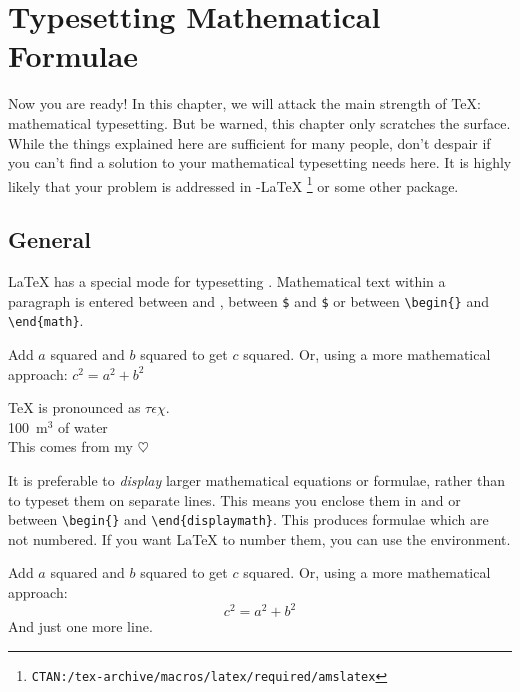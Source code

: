  
\chapter{Typesetting Mathematical Formulae}

\begin{intro}
  Now you are ready! In this chapter, we will attack the main strength
  of \TeX{}: mathematical typesetting. But be warned, this chapter
  only scratches the surface. While the things explained here are
  sufficient for many people, don't despair if you can't find a
  solution to your mathematical typesetting needs here. It is highly likely
  that your problem is addressed in \AmS-\LaTeX{}%
  \footnote{\texttt{CTAN:/tex-archive/macros/latex/required/amslatex}}
  or some other package.
\end{intro}
  
\section{General}

\LaTeX{} has a special mode for typesetting .
Mathematical text within a paragraph is entered between \ci{(}
and \ci{)},  %
between \texttt{\$} and \texttt{\$} or between %
\verb|\begin{|\verb|}| and \verb|\end{math}|.
\begin{example}
Add $a$ squared and $b$ squared 
to get $c$ squared. Or, using 
a more mathematical approach:
$c^{2}=a^{2}+b^{2}$
\end{example}
\begin{example}
\TeX{} is pronounced as 
$\tau\epsilon\chi$.\\[6pt]
100~m$^{3}$ of water\\[6pt]
This comes from my $\heartsuit$
\end{example}

It is preferable to \emph{display} larger mathematical equations or formulae,
rather than to typeset them on separate lines. This means you enclose them
in \ci{[} and \ci{]} or between
\verb|\begin{|\verb|}| and
  \verb|\end{displaymath}|.  This produces formulae which are not
numbered. If you want \LaTeX{} to number them, you can use the
 environment.
\begin{example}
Add $a$ squared and $b$ squared 
to get $c$ squared. Or, using 
a more mathematical approach:
\begin{displaymath}
c^{2}=a^{2}+b^{2}
\end{displaymath}
And just one more line.
\end{example}

